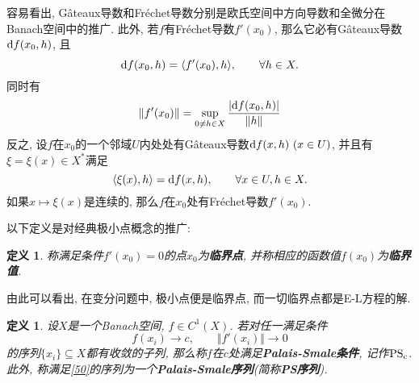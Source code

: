 \documentclass[12pt,a4paper]{article}
\newtheorem{definition}[theorem]{定义}
\begin{document}
容易看出, G\^ateaux导数和Fr\'echet导数分别是欧氏空间中方向导数和全微分在Banach空间中的推广.
此外, 若$f$有Fr\'echet导数$f'(x_0)$, 那么它必有G\^ateaux导数${\rm d}f(x_0, h)$, 且 
\begin{equation*}
    {\rm d}f(x_0, h) = \langle f'(x_0), h\rangle, \qquad \forall h \in X.
\end{equation*}
同时有
\begin{equation*}
    \Vert f'(x_0) \Vert = \sup_{0 \neq h \in X}\frac{|{\rm d}f(x_0, h)|}{\Vert h \Vert}
\end{equation*}
反之, 设$f$在$x_0$的一个邻域$U$内处处有G\^ateaux导数${\rm d}f(x, h)\ (x \in U)$, 并且有$\xi = \xi(x) \in X^*$满足 
\begin{equation*}
    \langle \xi(x), h\rangle = {\rm d}f(x, h), \qquad \forall x \in U, h \in X.
\end{equation*}
如果$x \mapsto \xi(x)$是连续的, 那么$f$在$x_0$处有Fr\'echet导数$f'(x_0)$.

以下定义是对经典极小点概念的推广:

\begin{definition}
    称满足条件$f'(x_0) = 0$的点$x_0$为\textbf{临界点}, 并称相应的函数值$f(x_0)$为\textbf{临界值}.
\end{definition}

由此可以看出, 在变分问题中, 极小点便是临界点, 而一切临界点都是E-L方程的解.

\begin{definition}
    设$X$是一个Banach空间, $f \in C^1(X)$. 若对任一满足条件 
    \begin{equation}\label{50}
        f(x_i) \rightarrow c, \qquad \Vert f'(x_i)\Vert \rightarrow 0
    \end{equation}
    的序列$\{x_i\} \subseteq X$都有收敛的子列, 那么称$f$在$c$处满足\textbf{Palais-Smale条件}, 记作${\rm PS_c}$.
    此外, 称满足\eqref{50}的序列为一个\textbf{Palais-Smale序列}(简称\textbf{PS序列}).
\end{definition}
\end{document}
